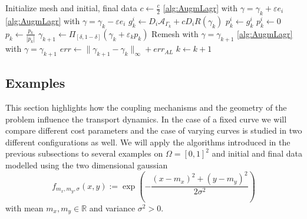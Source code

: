 \documentclass{article}
\def\R{{\mathbb R}}
\def\calA{{\mathcal A}} \def\calB{{\mathcal B}} \def\calC{{\mathcal C}}
\begin{document}
\begin{algorithm}[t]
    \caption{Minimization over the preferential path}\label{alg:MinCurve}
    \begin{algorithmic}
        \STATE Initialize mesh and initial, final data
            \STATE $c \leftarrow \frac{c}{2}$
        \ENDIF
                \STATE \autoref{alg:AugmLagr} with $\gamma=\gamma_{k} + \varepsilon e_i$
                \STATE \autoref{alg:AugmLagr} with $\gamma=\gamma_{k} - \varepsilon e_i$
                \STATE $g_{k}^i \leftarrow D_i \calA_{\Gamma_{k}} + c D_i R(\gamma_{k})$
                \IF{$|D_i \calA_{\Gamma_{k}} | > c|D_i R(\gamma_{k})|$ }
                    \STATE $p_{k}^i \leftarrow g_{k}^i$
                \ELSE
                    \STATE $p_{k}^i \leftarrow 0$
                \ENDIF
            \ENDFOR
            \STATE $p_{k} \leftarrow \frac{p_{k}}{| p_{k}|}$
            \STATE $\gamma_{k+1} \leftarrow \Pi_{[\delta,1-\delta]}(\gamma_{k}+\varepsilon_k p_{k})$
            \STATE Remesh with $\gamma=\gamma_{k+1}$
            \STATE \autoref{alg:AugmLagr} with $\gamma=\gamma_{k+1}$
            \STATE $err \leftarrow \| \gamma_{k+1} - \gamma_{k} \|_\infty + err_{AL}$
            \STATE $k \leftarrow k+1$
        \ENDWHILE
    \end{algorithmic}
\end{algorithm}





\subsection{Examples}

This section highlights how the coupling mechanisms and the geometry of the problem influence the transport dynamics. In the case of a fixed curve we will compare different cost parameters and the case of varying curves is studied in two different configurations as well.
We will apply the algorithms introduced in the previous subsections to several examples on $\Omega=[0,1]^2$ and initial and final data modelled using the two dimensional gaussian
\begin{equation}\label{eq:Gaussian}
    f_{m_x, m_y, \sigma}(x,y) := \exp\left(-\frac{(x-m_x)^2+(y-m_y)^2}{2\sigma^2}\right)
\end{equation}
with mean $m_x,m_y\in\R$ and variance $\sigma^2>0$.
\end{document}
